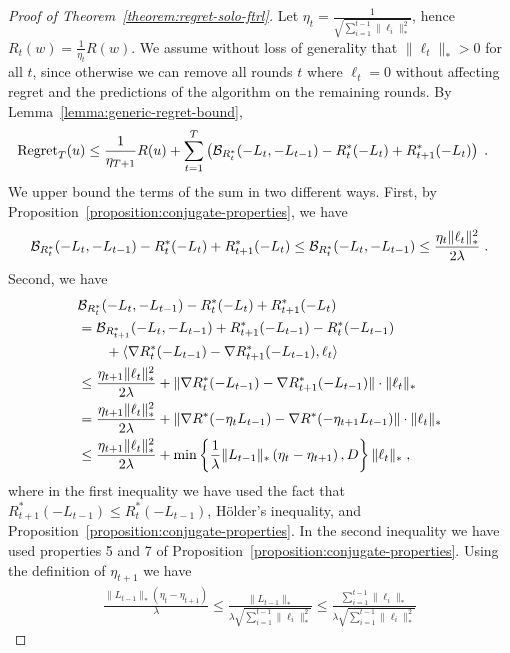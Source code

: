 \begin{proof}[Proof of Theorem~\ref{theorem:regret-solo-ftrl}]
Let $\eta_t = \frac{1}{\sqrt{\sum_{i=1}^{t-1} \|\ell_i\|_*^2}}$, hence $R_t(w)
= \frac{1}{\eta_t} R(w)$.  We assume without loss of generality that
$\|\ell_t\|_* > 0$ for all $t$, since otherwise we can remove all rounds $t$
where $\ell_t = 0$ without affecting regret and the predictions of the
algorithm on the remaining rounds.  By Lemma~\ref{lemma:generic-regret-bound},
\begin{align*}
\operatorname{Regret}_T(u)
& \le \frac{1}{\eta_{T+1}} R(u) + \sum_{t=1}^T \left( \mathcal{B}_{R_t^*}(-L_t, -L_{t-1}) - R_t^*(-L_t) + R_{t+1}^*(-L_t) \right) \; .
\end{align*}
We upper bound the terms of the sum in two different ways.
First, by Proposition~\ref{proposition:conjugate-properties}, we have
$$
\mathcal{B}_{R_t^*}(-L_t, -L_{t-1}) - R_t^*(-L_t) + R_{t+1}^*(-L_t)
\le \mathcal{B}_{R_t^*}(-L_t, -L_{t-1})
\le \frac{\eta_t \|\ell_t\|_*^2}{2\lambda} \; .
$$
Second, we have
\begin{align*}
& \mathcal{B}_{R_t^*}(-L_t, -L_{t-1}) - R_t^*(-L_t) + R_{t+1}^*(-L_t) \\
& = \mathcal{B}_{R_{t+1}^*}(-L_t, -L_{t-1}) + R^*_{t+1}(-L_{t-1}) - R_t^*(-L_{t-1}) \\
& \qquad + \langle \nabla R_t^*(-L_{t-1})-\nabla R_{t+1}^*(-L_{t-1}), \ell_t \rangle  \\
& \le \frac{\eta_{t+1} \|\ell_t\|_*^2}{2\lambda} + \| \nabla R_t^*(-L_{t-1})-\nabla R_{t+1}^*(-L_{t-1})\| \cdot \|\ell_t\|_* \\
& = \frac{\eta_{t+1} \|\ell_t\|_*^2}{2\lambda} + \| \nabla R^*(- \eta_{t} L_{t-1})-\nabla R^*(- \eta_{t+1} L_{t-1})\| \cdot \|\ell_t\|_* \\
& \le \frac{\eta_{t+1} \|\ell_t\|_*^2}{2\lambda} + \min\left\{\frac{1}{\lambda} \|L_{t-1}\|_* \left(\eta_{t} - \eta_{t+1} \right), D\right\} \|\ell_t\|_* \; ,
\end{align*}
where in the first inequality we have used the fact that $R^*_{t+1}(-L_{t-1})
\le R_t^*(-L_{t-1})$, H\"older's inequality, and
Proposition~\ref{proposition:conjugate-properties}.  In the second inequality
we have used properties 5 and 7 of
Proposition~\ref{proposition:conjugate-properties}. Using the definition of
$\eta_{t+1}$ we have
\begin{align*}
\frac{\|L_{t-1}\|_* (\eta_{t} -\eta_{t+1})}{\lambda}
\le \frac{ \|L_{t-1}\|_*}{\lambda \sqrt{\sum_{i=1}^{t-1} \|\ell_i\|_*^2}}
\le \frac{ \sum_{i=1}^{t-1} \|\ell_i\|_*}{\lambda \sqrt{\sum_{i=1}^{t-1} \|\ell_i\|_*^2}}

\end{align*}
\end{proof}
